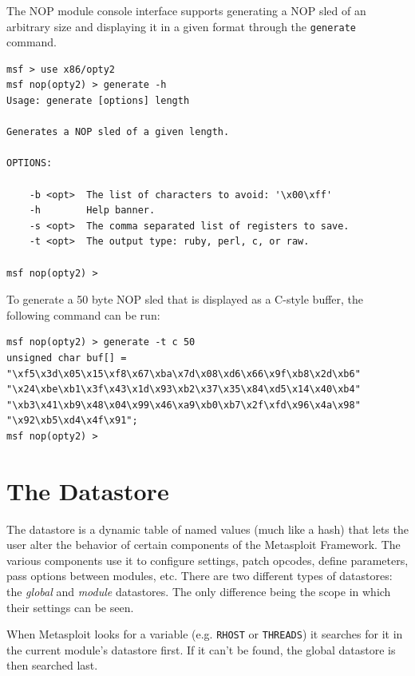 \documentclass{report}
\begin{document}
\par
The NOP module console interface supports generating a NOP sled of an arbitrary
size and displaying it in a given format through the \texttt{generate} command.

\begin{verbatim}
msf > use x86/opty2
msf nop(opty2) > generate -h
Usage: generate [options] length

Generates a NOP sled of a given length.

OPTIONS:

    -b <opt>  The list of characters to avoid: '\x00\xff'
    -h        Help banner.
    -s <opt>  The comma separated list of registers to save.
    -t <opt>  The output type: ruby, perl, c, or raw.

msf nop(opty2) >
\end{verbatim}

\par
To generate a 50 byte NOP sled that is displayed as a C-style buffer, the
following command can be run:

\begin{verbatim}
msf nop(opty2) > generate -t c 50
unsigned char buf[] =
"\xf5\x3d\x05\x15\xf8\x67\xba\x7d\x08\xd6\x66\x9f\xb8\x2d\xb6"
"\x24\xbe\xb1\x3f\x43\x1d\x93\xb2\x37\x35\x84\xd5\x14\x40\xb4"
"\xb3\x41\xb9\x48\x04\x99\x46\xa9\xb0\xb7\x2f\xfd\x96\x4a\x98"
"\x92\xb5\xd4\x4f\x91";
msf nop(opty2) >
\end{verbatim}

\pagebreak

\chapter{The Datastore}

\par
The datastore is a dynamic table of named values (much like a hash) that lets
the user alter the behavior of certain components of the Metasploit Framework.
The various components use it to configure settings, patch opcodes, define
parameters, pass options between modules, etc. There are two different types of
datastores: the \textit{global} and \textit{module} datastores. The only
difference being the scope in which their settings can be seen.

\par
When Metasploit looks for a variable (e.g. \texttt{RHOST} or \texttt{THREADS})
it searches for it in the current module's datastore first. If it can't be found, 
the global datastore is then searched last.
\end{document}

